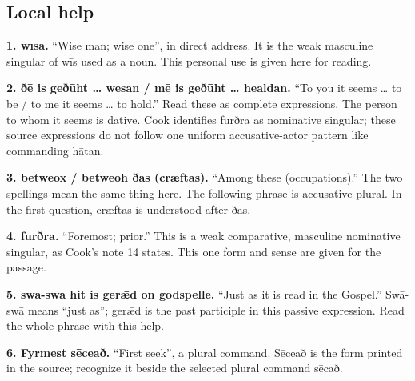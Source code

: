 \subsection*{Local help}

\textbf{1. wīsa.} “Wise man; wise one”, in direct address. It is the weak masculine singular of wīs used as a noun. This personal use is given here for reading.

\textbf{2. ðē is geðūht … wesan /\allowbreak{} mē is geðūht … healdan.} “To you it seems … to be /\allowbreak{} to me it seems … to hold.” Read these as complete expressions. The person to whom it seems is dative. Cook identifies furðra as nominative singular; these source expressions do not follow one uniform accusative-actor pattern like commanding hātan.

\textbf{3. betweox /\allowbreak{} betweoh ðās (cræftas).} “Among these (occupations).” The two spellings mean the same thing here. The following phrase is accusative plural. In the first question, cræftas is understood after ðās.

\textbf{4. furðra.} “Foremost; prior.” This is a weak comparative, masculine nominative singular, as Cook’s note 14 states. This one form and sense are given for the passage.

\textbf{5. swā-swā hit is gerǣd on godspelle.} “Just as it is read in the Gospel.” Swā-swā means “just as”; gerǣd is the past participle in this passive expression. Read the whole phrase with this help.

\textbf{6. Fyrmest sēceað.} “First seek”, a plural command. Sēceað is the form printed in the source; recognize it beside the selected plural command sēcað.

